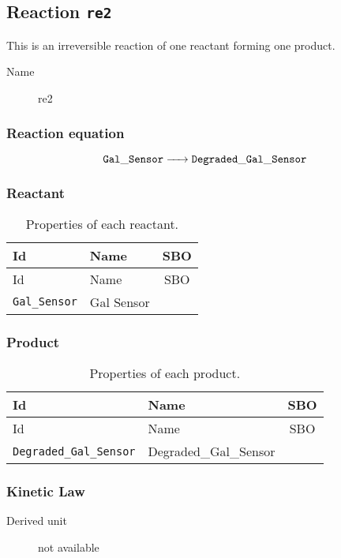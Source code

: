 \documentclass[11pt,twoside,bibtotoc,a4paper]{scrartcl}
\newcommand{\reaction}[1]{\begin{equation}\ce{#1}\end{equation}}
\begin{document}
\subsection{Reaction \texttt{re2}}
This is an irreversible reaction of one reactant forming one product.\begin{description}
\item[Name] re2
\end{description}

\subsubsection*{Reaction equation}
\reaction{ $\mathtt{Gal\-\_Sensor}$ ->  $\mathtt{Degraded\-\_Gal\-\_Sensor}$}

\subsubsection*{Reactant}
\begin{longtable}[h!]{llc}
\caption{Properties of each reactant.}\\
\toprule
Id & Name & SBO\\
\midrule
\endfirsthead
\toprule
Id & Name & SBO\\
\midrule
\endhead
\texttt{Gal\-\_Sensor}&Gal Sensor&\\
\bottomrule\end{longtable}

\subsubsection*{Product}
\begin{longtable}[h!]{llc}
\caption{Properties of each product.}\\
\toprule
Id & Name & SBO\\
\midrule
\endfirsthead
\toprule
Id & Name & SBO\\
\midrule
\endhead
\texttt{Degraded\-\_Gal\-\_Sensor}&Degraded\-\_Gal\-\_Sensor&\\
\bottomrule\end{longtable}

\subsubsection*{Kinetic Law}
\begin{description}
\item[Derived unit] not available
\end{description}
\end{document}
